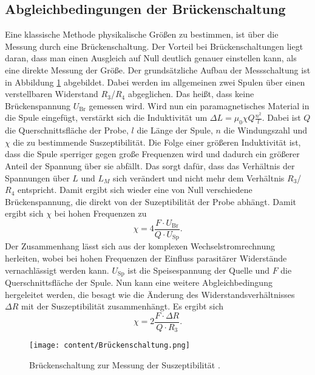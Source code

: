 \subsection{Abgleichbedingungen der Brückenschaltung}
Eine klassische Methode physikalische Größen zu bestimmen, ist über die Messung durch eine Brückenschaltung.
Der Vorteil bei Brückenschaltungen liegt daran, dass man einen Ausgleich auf Null deutlich genauer einstellen kann, als eine direkte Messung der Größe.
Der grundsätzliche Aufbau der Messschaltung ist in Abbildung \ref{fig:Brücke} abgebildet. Dabei werden im allgemeinen zwei Spulen über einen verstellbaren Widerstand
$R_3$/$R_4$ abgeglichen. Das heißt, dass keine Brückenspannung $U_\text{Br}$ gemessen wird. Wird nun ein paramagnetisches Material in 
die Spule eingefügt, verstärkt sich die Induktivität um $\Delta L=\mu_0\chi Q \frac{n^2}{l}$. Dabei ist $Q$ die Querschnittsfläche der Probe, $l$ die Länge der Spule,
$n$ die Windungszahl und $\chi$ die zu bestimmende Suszeptibilität. Die Folge einer größeren Induktivität ist, dass die Spule sperriger
gegen große Frequenzen wird und dadurch ein größerer Anteil der Spannung über sie abfällt. Das sorgt dafür, dass das Verhältnis der Spannungen über $L$ und $L_M$
sich verändert und nicht mehr dem Verhältnis $R_3$/$R_4$ entspricht. Damit ergibt sich wieder eine von Null verschiedene Brückenspannung, die direkt von
der Suzeptibilität der Probe abhängt. Damit ergibt sich $\chi$ bei hohen Frequenzen zu
\begin{equation}
    \chi= 4 \frac{F\cdot U_\text{Br}}{Q\cdot U_\text{Sp}}.
    \label{eq:chiU}
\end{equation}
Der Zusammenhang lässt sich aus der komplexen Wechselstromrechnung herleiten, wobei bei hohen Frequenzen der Einfluss
parasitärer Widerstände vernachlässigt werden kann. $U_\text{Sp}$ ist die Speisespannung der Quelle und $F$ die Querschnittsfläche der Spule.
Nun kann eine weitere Abgleichbedingung hergeleitet werden, die besagt wie die Änderung des Widerstandsverhältnisses $\Delta R$ mit der Suszeptibilität 
zusammenhängt. Es ergibt sich
\begin{equation}
    \chi= 2 \frac{F\cdot \Delta R}{Q\cdot R_3}.
    \label{eq:chiR}
\end{equation}
\begin{figure}[H]
    \centering
    \texttt{[image: content/Brückenschaltung.png]}
    \caption{Brückenschaltung zur Messung der Suszeptibilität \cite{sample}.}
    \label{fig:Brücke}
\end{figure}


